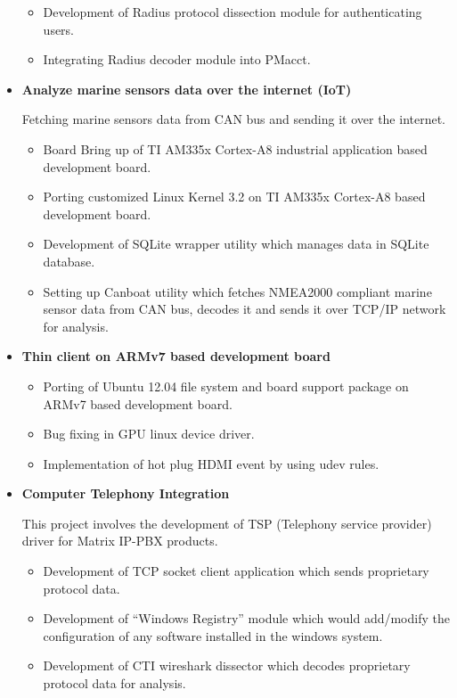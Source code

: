 \documentclass[letterpaper,10pt]{article}
\newcommand{\resitem}[1]{\item #1 \vspace{-2pt}}
\begin{document}
\begin{itemize}
\begin{itemize}
	    \resitem{Development of Radius protocol dissection module for authenticating users.}
		
		\resitem{Integrating Radius decoder module into PMacct.}
	\end{itemize}
	
\item
    \textbf{Analyze marine sensors data over the internet (IoT)}
	
    Fetching marine sensors data from CAN bus and sending it over the internet.
    
	\begin{itemize}
	    \resitem{Board Bring up of TI AM335x Cortex-A8 industrial application based development board.}
	
	    \resitem{Porting customized Linux Kernel 3.2 on TI AM335x Cortex-A8 based development board.}
	    
	    \resitem{Development of SQLite wrapper utility which manages data in SQLite database.}
	    
	    \resitem{Setting up Canboat utility which fetches NMEA2000 compliant marine sensor data from CAN bus, decodes it and sends it over TCP/IP network for analysis.}

	\end{itemize}
	
\item
    \textbf{Thin client on ARMv7 based development board}
    
	\begin{itemize}
	    \resitem{Porting of Ubuntu 12.04 file system and board support package on ARMv7 based development board.}
	    
	    \resitem{Bug fixing in GPU linux device driver.}
	    
	    \resitem{Implementation of hot plug HDMI event by using udev rules.}
	    
	\end{itemize}
	
\item
    \textbf{Computer Telephony Integration}
    
    This project involves the development of TSP (Telephony service provider) driver for Matrix IP-PBX products.
    
	\begin{itemize}
	    \resitem{Development of TCP socket client application which sends proprietary protocol data.}
	    
	    \resitem{Development of “Windows Registry” module which would add/modify the configuration of any software installed in the windows system.}
	    
	    \resitem{Development of CTI wireshark dissector which decodes proprietary protocol data for analysis.}
	    
	\end{itemize}

\end{itemize}
\end{document}
